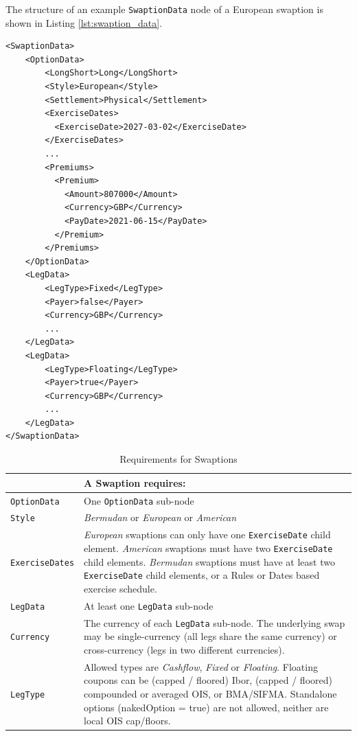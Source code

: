 The structure of an example \lstinline!SwaptionData!  node of a European swaption is shown in Listing
\ref{lst:swaption_data}.

\begin{listing}[H]
\begin{verbatim}
<SwaptionData>
    <OptionData>
        <LongShort>Long</LongShort>
        <Style>European</Style>
        <Settlement>Physical</Settlement>
        <ExerciseDates>
          <ExerciseDate>2027-03-02</ExerciseDate>
        </ExerciseDates>
        ...
        <Premiums>
          <Premium>
            <Amount>807000</Amount>
            <Currency>GBP</Currency>
            <PayDate>2021-06-15</PayDate>
          </Premium>
        </Premiums>
    </OptionData>
    <LegData>
        <LegType>Fixed</LegType>
        <Payer>false</Payer>    
        <Currency>GBP</Currency>
        ...
    </LegData>
    <LegData>
        <LegType>Floating</LegType>
        <Payer>true</Payer>     
        <Currency>GBP</Currency>
        ...
    </LegData>
</SwaptionData>
\end{verbatim}
\caption{Swaption data}
\label{lst:swaption_data}
\end{listing}

\begin{table}[H]
\centering
\begin{tabular} {|l|p{10cm}|}
    \hline
        & \bfseries{A  Swaption requires:} \\  \hline
    \lstinline!OptionData! & One \lstinline!OptionData! sub-node  \\  \hline
    \lstinline!Style! &  \emph{Bermudan} or \emph{European} or \emph{American}\\ \hline
    \lstinline!ExerciseDates! & \emph{European} swaptions can only have one \lstinline!ExerciseDate! child element. \emph{American} swaptions must have two \lstinline!ExerciseDate! child elements. \emph{Bermudan} swaptions must have at least two \lstinline!ExerciseDate! child elements, or a Rules or Dates based exercise schedule. \\ \hline
    \lstinline!LegData! &  At least one \lstinline!LegData! sub-node \\ \hline
    \lstinline!Currency! & The currency of each \lstinline!LegData! sub-node. The underlying swap may be single-currency (all legs share the same currency) or cross-currency (legs in two different currencies).\\ \hline
    \lstinline!LegType! & Allowed types are \emph{Cashflow}, \emph{Fixed} or \emph{Floating}. Floating coupons can be (capped / floored) Ibor, (capped / floored) compounded or averaged OIS, or BMA/SIFMA. Standalone options (nakedOption = true) are not allowed, neither are local OIS cap/floors. \\ \hline
  \end{tabular}
  \caption{Requirements for Swaptions}
  \label{tab:swaption_requirements}
\end{table}

